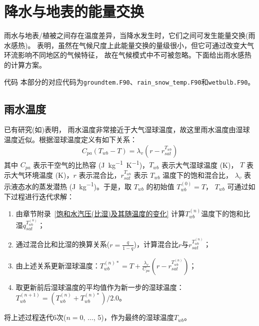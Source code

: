 \chapter{降水与地表的能量交换}

雨水与地表/植被之间存在温度差异，当降水发生时，它们之间可发生能量交换(雨水感热)。
\citet{wei2014impact} 表明，虽然在气候尺度上此能量交换的量级很小，但它可通过改变大气环流影响不同地区的气候特征，
故在气候模式中不可被忽略。下面给出雨水感热的计算方案。
\begin{mymdframed}{代码}
本部分的对应代码为\texttt{groundtem.F90}、\texttt{rain\_snow\_temp.F90}和\texttt{wetbulb.F90}。
\end{mymdframed}


\section{雨水温度}\label{雨水温度}
已有研究(如\citet{anderson1998moored})表明，
雨水温度非常接近于大气湿球温度，故这里雨水温度由湿球温度近似。根据湿球温度定义有如下关系：
\begin{equation}
C_{p a}\left(T_{w b}-T\right)=\lambda_{v}\left(r-r_{s a t}^{T_{w b}}\right)
\end{equation}
其中 $C_{pa}$ 表示干空气的比热容 (\unit{J.kg^{-1}.K^{-1}})，$T_{wb}$ 表示大气湿球温度 (K)，
$T$ 表示大气环境温度 (K)，$r$ 表示混合比，$r_{sat}^{T_{wb}}$ 表示 $T_{wb}$ 温度下的饱和混合比，
$\lambda_v$ 表示液态水的蒸发潜热 (\unit{J.kg^{-1}})。于是，取 $T_{wb}$ 的初始值 $T_{wb}^{\left(0\right)}=T$，
$T_{wb}$ 可通过如下过程进行迭代求解：
\begin{enumerate}
    \item 由章节附录~\ref{饱和水汽压(比湿)及其随温度的变化} 计算$T_{wb}^{\left(n\right)}$温度下的饱和比湿$q_{sat}^{T_{wb}^{\left(n\right)}}$；
    \item 通过混合比和比湿的换算关系($r=\frac{q}{1-q}$)，计算混合比$r$与$r_{sat}^{T_{wb}^{\left(n\right)}}$；
    \item 由上述关系更新湿球温度：$T_{wb}^{\left(n\right)\ast}=T+\frac{\lambda_v}{C_{pa}}\left(r-r_{sat}^{T_{wb}^{\left(n\right)}}\right)$；
    \item 取更新前后湿球温度的平均值作为新一步的湿球温度：$T_{wb}^{\left(n+1\right)}=\left(T_{wb}^{\left(n\right)}+T_{wb}^{\left(n\right)\ast}\right)/2.0$。
\end{enumerate}
将上述过程迭代6次($n=0$, $\ldots$, 5)，作为最终的湿球温度$T_{wb}$。


